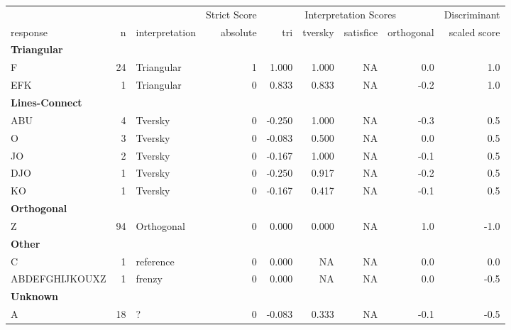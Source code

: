 \documentclass[
  letterpaper,
  DIV=11,
  numbers=noendperiod]{scrreprt}
\begin{document}
\begin{tabular}[t]{l|r|l|r|r|r|r|r|r}
\hline
\multicolumn{3}{c|}{ } & \multicolumn{1}{c|}{Strict Score} & \multicolumn{4}{c|}{Interpretation Scores} & \multicolumn{1}{c}{Discriminant} \\
\cline{4-4} \cline{5-8} \cline{9-9}
response & n & interpretation & absolute & tri & tversky & satisfice & orthogonal & scaled score\\
\hline
\multicolumn{9}{l}{\textbf{Triangular}}\\
\hline
\hspace{1em}F & 24 & Triangular & 1 & 1.000 & 1.000 & NA & 0.0 & 1.0\\
\hline
\hspace{1em}EFK & 1 & Triangular & 0 & 0.833 & 0.833 & NA & -0.2 & 1.0\\
\hline
\multicolumn{9}{l}{\textbf{Lines-Connect}}\\
\hline
\hspace{1em}ABU & 4 & Tversky & 0 & -0.250 & 1.000 & NA & -0.3 & 0.5\\
\hline
\hspace{1em}O & 3 & Tversky & 0 & -0.083 & 0.500 & NA & 0.0 & 0.5\\
\hline
\hspace{1em}JO & 2 & Tversky & 0 & -0.167 & 1.000 & NA & -0.1 & 0.5\\
\hline
\hspace{1em}DJO & 1 & Tversky & 0 & -0.250 & 0.917 & NA & -0.2 & 0.5\\
\hline
\hspace{1em}KO & 1 & Tversky & 0 & -0.167 & 0.417 & NA & -0.1 & 0.5\\
\hline
\multicolumn{9}{l}{\textbf{Orthogonal}}\\
\hline
\hspace{1em}Z & 94 & Orthogonal & 0 & 0.000 & 0.000 & NA & 1.0 & -1.0\\
\hline
\multicolumn{9}{l}{\textbf{Other}}\\
\hline
\hspace{1em}C & 1 & reference & 0 & 0.000 & NA & NA & 0.0 & 0.0\\
\hline
\hspace{1em}ABDEFGHIJKOUXZ & 1 & frenzy & 0 & 0.000 & NA & NA & 0.0 & -0.5\\
\hline
\multicolumn{9}{l}{\textbf{Unknown}}\\
\hline
\hspace{1em}A & 18 & ? & 0 & -0.083 & 0.333 & NA & -0.1 & -0.5\\

\end{tabular}
\end{document}
